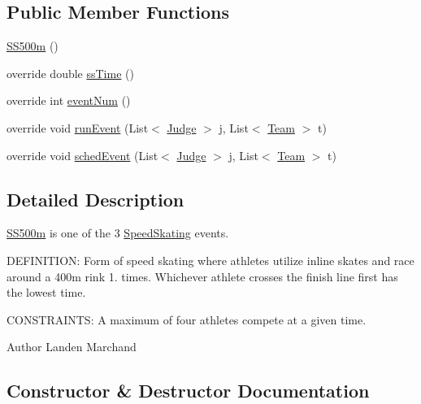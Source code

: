 \subsection*{Public Member Functions}
\begin{DoxyCompactItemize}
\item 
\hyperlink{classProject__Codename__Olympia__v1_1_1__0_1_1SS500m_af01c484ae40be1166c5bc473b8876002}{S\+S500m} ()
\item 
override double \hyperlink{classProject__Codename__Olympia__v1_1_1__0_1_1SS500m_a1fc1ed5e2b6d1fa4d1921a3d155c6a6f}{ss\+Time} ()
\item 
override int \hyperlink{classProject__Codename__Olympia__v1_1_1__0_1_1SS500m_a7b5584a50c59e67457f86ebd38b8e4a8}{event\+Num} ()
\item 
override void \hyperlink{classProject__Codename__Olympia__v1_1_1__0_1_1SS500m_a28582161ab61bb80635656e48ebfc664}{run\+Event} (List$<$ \hyperlink{classProject__Codename__Olympia__v1_1_1__0_1_1Judge}{Judge} $>$ j, List$<$ \hyperlink{classProject__Codename__Olympia__v1_1_1__0_1_1Team}{Team} $>$ t)
\item 
override void \hyperlink{classProject__Codename__Olympia__v1_1_1__0_1_1SS500m_a11d698b484f98493d11661d43fa3ec12}{sched\+Event} (List$<$ \hyperlink{classProject__Codename__Olympia__v1_1_1__0_1_1Judge}{Judge} $>$ j, List$<$ \hyperlink{classProject__Codename__Olympia__v1_1_1__0_1_1Team}{Team} $>$ t)
\end{DoxyCompactItemize}


\subsection{Detailed Description}
\hyperlink{classProject__Codename__Olympia__v1_1_1__0_1_1SS500m}{S\+S500m} is one of the 3 \hyperlink{classProject__Codename__Olympia__v1_1_1__0_1_1SpeedSkating}{Speed\+Skating} events. 

D\+E\+F\+I\+N\+I\+T\+I\+ON\+: Form of speed skating where athletes utilize inline skates and race around a 400m rink 1. times. Whichever athlete crosses the finish line first has the lowest time.

C\+O\+N\+S\+T\+R\+A\+I\+N\+TS\+: A maximum of four athletes compete at a given time.\begin{DoxyAuthor}{Author}
Landen Marchand 
\end{DoxyAuthor}


\subsection{Constructor \& Destructor Documentation}
\mbox{\label{classProject__Codename__Olympia__v1_1_1__0_1_1SS500m_af01c484ae40be1166c5bc473b8876002}} 
